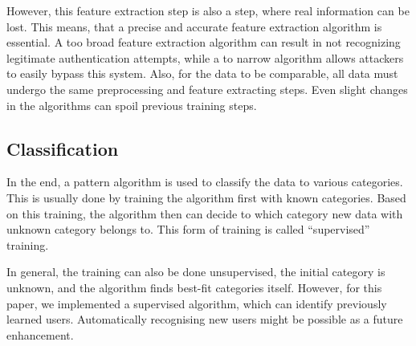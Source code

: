 However, this feature extraction step is also a step, where real information can be lost. This means, that a precise and accurate feature extraction algorithm is essential. A too broad feature extraction algorithm can result in not recognizing legitimate authentication attempts, while a to narrow algorithm allows attackers to easily bypass this system. Also, for the data to be comparable, all data must undergo the same preprocessing and feature extracting steps. Even slight changes in the algorithms can spoil previous training steps.

\subsection{Classification}
In the end, a pattern algorithm is used to classify the data to various categories. This is usually done by training the algorithm first with known categories. Based on this training, the algorithm then can decide to which category new data with unknown category belongs to. This form of training is called ``supervised'' training.

In general, the training can also be done unsupervised, \ie the initial category is unknown, and the algorithm finds best-fit categories itself. However, for this paper, we implemented a supervised algorithm, which can identify previously learned users. Automatically recognising new users might be possible as a future enhancement.